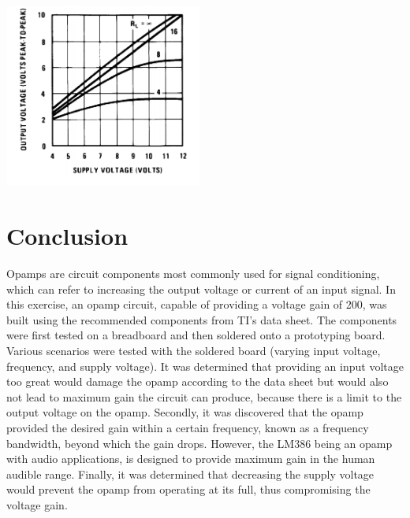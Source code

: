 \documentclass[journal]{IEEEtran}
\begin{document}
\begingroup
\medskip
    \centering
    \includegraphics[width=245]{images/lab6_6.png}
    \label{fig:supply}
    \medskip
\endgroup

\section{Conclusion}

\noindent Opamps are circuit components most commonly used for signal conditioning, which can refer to increasing the output voltage or current of an input signal. In this exercise, an opamp circuit, capable of providing a voltage gain of 200, was built using the recommended components from TI's data sheet. The components were first tested on a breadboard and then soldered onto a prototyping board. Various scenarios were tested with the soldered board (varying input voltage, frequency, and supply voltage). It was determined that providing an input voltage too great would damage the opamp according to the data sheet but would also not lead to maximum gain the circuit can produce, because there is a limit to the output voltage on the opamp. Secondly, it was discovered that the opamp provided the desired gain within a certain frequency, known as a frequency bandwidth, beyond which the gain drops. However, the LM386 being an opamp with audio applications, is designed to provide maximum gain in the human audible range. Finally, it was determined that decreasing the supply voltage would prevent the opamp from operating at its full, thus compromising the voltage gain.\\ 
\end{document}

